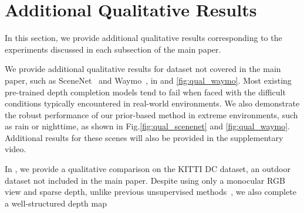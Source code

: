 % 
% 


\section{Additional Qualitative Results}
In this section, we provide additional qualitative results corresponding to the experiments discussed in each subsection of the main paper.

We provide additional qualitative results for dataset not covered in the main paper, such as SceneNet~\cite{mccormac2017scenenet} and Waymo~\cite{sun2020waymo}, in  and \ref{fig:qual_waymo}.
Most existing pre-trained depth completion models tend to fail when faced with the difficult conditions typically encountered in real-world environments.
We also demonstrate the robust performance of our prior-based method in extreme environments, such as rain or nighttime, as shown in Fig.\ref{fig:qual_scenenet} and \ref{fig:qual_waymo}.
Additional results for these scenes will also be provided in the supplementary video.


In , we provide a qualitative comparison on the KITTI DC dataset, an outdoor dataset not included in the main paper. Despite using only a monocular RGB view and sparse depth, unlike previous unsupervised methods~\cite{ma2018self, wong2021unsupervised}, we also complete a well-structured depth map

